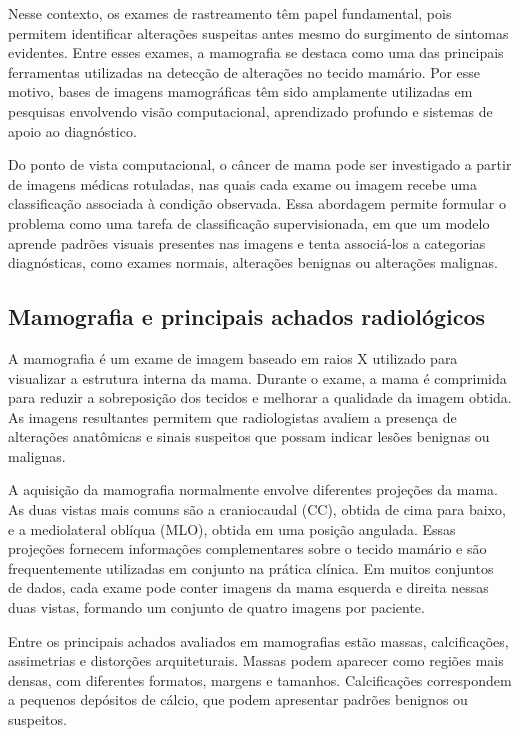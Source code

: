 \documentclass[
    12pt,
    openright,
    oneside,
    a4paper,
    english,
    brazil
]{abntex2}
\begin{document}
Nesse contexto, os exames de rastreamento têm papel fundamental, pois permitem identificar alterações suspeitas antes mesmo do surgimento de sintomas evidentes. Entre esses exames, a mamografia se destaca como uma das principais ferramentas utilizadas na detecção de alterações no tecido mamário. Por esse motivo, bases de imagens mamográficas têm sido amplamente utilizadas em pesquisas envolvendo visão computacional, aprendizado profundo e sistemas de apoio ao diagnóstico.

Do ponto de vista computacional, o câncer de mama pode ser investigado a partir de imagens médicas rotuladas, nas quais cada exame ou imagem recebe uma classificação associada à condição observada. Essa abordagem permite formular o problema como uma tarefa de classificação supervisionada, em que um modelo aprende padrões visuais presentes nas imagens e tenta associá-los a categorias diagnósticas, como exames normais, alterações benignas ou alterações malignas.

\subsection{Mamografia e principais achados radiológicos}

A mamografia é um exame de imagem baseado em raios X utilizado para visualizar a estrutura interna da mama. Durante o exame, a mama é comprimida para reduzir a sobreposição dos tecidos e melhorar a qualidade da imagem obtida. As imagens resultantes permitem que radiologistas avaliem a presença de alterações anatômicas e sinais suspeitos que possam indicar lesões benignas ou malignas.

A aquisição da mamografia normalmente envolve diferentes projeções da mama. As duas vistas mais comuns são a craniocaudal (CC), obtida de cima para baixo, e a mediolateral oblíqua (MLO), obtida em uma posição angulada. Essas projeções fornecem informações complementares sobre o tecido mamário e são frequentemente utilizadas em conjunto na prática clínica. Em muitos conjuntos de dados, cada exame pode conter imagens da mama esquerda e direita nessas duas vistas, formando um conjunto de quatro imagens por paciente.

Entre os principais achados avaliados em mamografias estão massas, calcificações, assimetrias e distorções arquiteturais. Massas podem aparecer como regiões mais densas, com diferentes formatos, margens e tamanhos. Calcificações correspondem a pequenos depósitos de cálcio, que podem apresentar padrões benignos ou suspeitos. 
\end{document}
